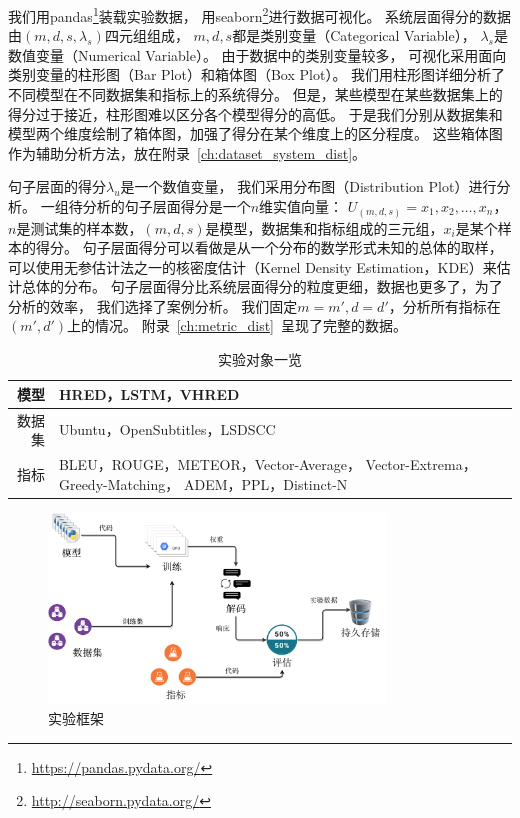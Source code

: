 我们用pandas\footnote{\url{https://pandas.pydata.org/}}装载实验数据，
用seaborn\footnote{\url{http://seaborn.pydata.org/}}进行数据可视化。
系统层面得分的数据由$(m, d, s, \lambda_s)$四元组组成，
$m, d, s$都是类别变量（Categorical Variable），
$\lambda_s$是数值变量（Numerical Variable）。
由于数据中的类别变量较多，
可视化采用面向类别变量的柱形图（Bar Plot）和箱体图（Box Plot）。
我们用柱形图详细分析了不同模型在不同数据集和指标上的系统得分。
但是，某些模型在某些数据集上的得分过于接近，柱形图难以区分各个模型得分的高低。
于是我们分别从数据集和模型两个维度绘制了箱体图，加强了得分在某个维度上的区分程度。
这些箱体图作为辅助分析方法，放在附录~\ref{ch:dataset_system_dist}。

句子层面的得分$\lambda_u$是一个数值变量，
我们采用分布图（Distribution Plot）进行分析。
一组待分析的句子层面得分是一个$n$维实值向量： $U_{(m, d, s)} = x_1, x_2, \dots, x_n$，
$n$是测试集的样本数，$(m, d, s)$是模型，数据集和指标组成的三元组，$x_i$是某个样本的得分。
句子层面得分可以看做是从一个分布的数学形式未知的总体的取样，
可以使用无参估计法之一的核密度估计（Kernel Density Estimation，KDE）来估计总体的分布。
句子层面得分比系统层面得分的粒度更细，数据也更多了，为了分析的效率，
我们选择了案例分析。
我们固定$m = m', d = d'$，分析所有指标在$(m', d')$上的情况。
附录~\ref{ch:metric_dist}~呈现了完整的数据。

\begin{table}[H]
    \centering
    \caption{实验对象一览}
    \label{tab:experiment_triples}
    \begin{tabular}{|r|m{}|}
        \hline
        模型 & HRED，LSTM，VHRED \\
        \hline
        数据集 & Ubuntu，OpenSubtitles，LSDSCC \\
        \hline
        指标 & BLEU，ROUGE，METEOR，Vector-Average，
        Vector-Extrema，Greedy-Matching，
        ADEM，PPL，Distinct-N \\
        \hline
    \end{tabular}
\end{table}

\begin{figure}[H]
    \centering
    \includegraphics[width=0.8\textwidth]{figure/drawio/eval_v4.pdf}
    \caption{实验框架}
    \label{fig:framework}
\end{figure}


